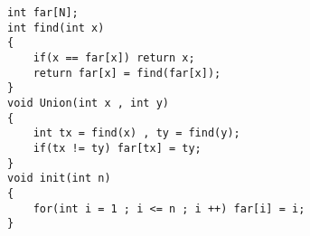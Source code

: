 \documentclass[E:/GsjzTle/main/main.tex]{subfiles}
\begin{document}
\begin{lstlisting}
int far[N];
int find(int x)
{
	if(x == far[x]) return x;
	return far[x] = find(far[x]);
}
void Union(int x , int y)
{
	int tx = find(x) , ty = find(y);
	if(tx != ty) far[tx] = ty;
}
void init(int n)
{
	for(int i = 1 ; i <= n ; i ++) far[i] = i;
}
\end{lstlisting}
\end{document}
